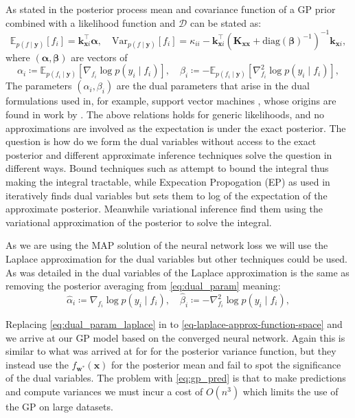 \documentclass{article}
\newcommand{\dataset}{\ensuremath{\mathcal{D}}}
\newcommand{\mathbold}[1]{\bm{#1}}
\newcommand{\mbf}[1]{\mathbf{#1}}
\newcommand{\valpha}[0]{\mathbold{\alpha}}
\newcommand{\vbeta}[0]{\mathbold{\beta}}
\newcommand{\diag}{\text{{diag}}}
\newcommand{\vx}{\mbf{x}}
\newcommand{\vy}{\mbf{y}}
\newcommand{\vw}{\mbf{w}}
\newcommand{\MKxx}{\mbf{K}_{\mbf{x}\mbf{x}}}
\newcommand{\vk}{\mbf{k}}
\newcommand{\myexpect}{\mathbb{E}}
\begin{document}
As stated in \citet[Lemma~1]{csato2002sparse} the posterior process mean and covariance function of a GP prior combined with a likelihood function and $\dataset$ can be stated as:
\begin{equation}  \label{eq:gp_pred}
 \myexpect_{p(f\mid\vy)}[f_i] = \vk_{\vx i}^\top \valpha , \quad
\textrm{Var}_{p(f\mid\vy)}[f_i] = \kappa_{ii} - \vk_{\vx i}^\top ( \MKxx + \diag(\vbeta)^{-1})^{-1} \vk_{\vx i},
\end{equation}
where $(\valpha,\vbeta)$ are vectors of
\begin{equation}
\label{eq:dual_param}
\alpha_i \coloneqq\myexpect_{p(f_i \mid \vy)}[\nabla_{f_i}\log p(y_i \mid f_i)],  \quad
\beta_i \coloneqq - \myexpect_{p(f_i \mid \vy)}[\nabla^2_{f_i}\log p(y_i \mid f_i)] ,
\end{equation}
The parameters $(\alpha_i, \beta_i)$ are the dual parameters that arise in the dual formulations used in, for example, support vector machines \citep{cortes1995support}, whose origins are found in work by \citet{kimeldorf1971some}. The above relations holds for generic likelihoods, and no approximations are involved as the expectation is under the exact posterior. The question is how do we form the dual variables without access to the exact posterior and different approximate inference techniques solve the question in different ways. Bound techniques such as \citet{jaakkola1997variational} attempt to bound the integral thus making the integral tractable, while Expecation Propogation (EP) as used in \citet{csato2002sparse} iteratively finds dual variables but sets them to log of the expectation of the approximate posterior. Meanwhile variational inference  \cite{khan2017conjugate, adam2021dual} find them using the variational approximation of the posterior to solve the integral.

As we are using the MAP solution of the neural network loss we will use the Laplace approximation for the dual variables but other techniques could be used. As was detailed in \cite{wilkinson2023bayes, rasmussen2006gaussian} the dual variables of the Laplace approximation is the same as removing the posterior averaging from \cref{eq:dual_param} meaning:
\begin{equation}
\label{eq:dual_param_laplace}
\hat{\alpha}_i \coloneqq \nabla_{f_i}\log p(y_i \mid f_i),  \quad
\hat{\beta}_i \coloneqq - \nabla^2_{f_i}\log p(y_i \mid f_i),
\end{equation}

Replacing \cref{eq:dual_param_laplace} in to \cref{eq-laplace-approx-function-space} and we arrive at our GP model based on the converged neural network. Again this is similar to what was arrived at for \citet{immerImprovingPredictionsBayesian2021} for the posterior variance function, but they instead use the $f_{\vw^*}(\vx)$ for the posterior mean and fail to spot the significance of the dual variables. The problem with \cref{eq:gp_pred} is that to make predictions and compute variances we must incur a cost of $O(n^3)$ which limits the use of the GP on large datasets.
\end{document}
